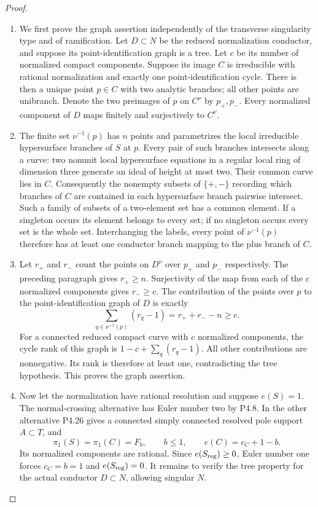 \begin{proof}

\begin{enumerate}[label={$\langle1\rangle$\arabic*.},leftmargin=*]
\item We first prove the graph assertion independently of
the transverse singularity type and of ramification.
Let $D\subset N$ be the reduced normalization conductor,
and suppose its point-identification graph is a tree.
Let $c$ be its number of normalized compact components.
Suppose its image $C$ is irreducible with rational
normalization and exactly one point-identification
cycle. There is then a unique point $p\in C$ with
two analytic branches; all other points are unibranch.
Denote the two preimages of $p$ on $C^\nu$ by
$p_+,p_-$. Every normalized component of $D$ maps
finitely and surjectively to $C^\nu$.

\item The finite set $\nu^{-1}(p)$ has $n$ points and
parametrizes the local irreducible hypersurface
branches of $S$ at $p$. Every pair of such branches
intersects along a curve: two nonunit local
hypersurface equations in a regular local ring of
dimension three generate an ideal of height at most
two. Their common curve lies in $C$. Consequently
the nonempty subsets of $\{+,-\}$ recording which
branches of $C$ are contained in each hypersurface
branch pairwise intersect. Such a family of subsets
of a two-element set has a common element. If a
singleton occurs its element belongs to every set;
if no singleton occurs every set is the whole set.
Interchanging the labels, every point of
$\nu^{-1}(p)$ therefore has at least one conductor
branch mapping to the plus branch of $C$.

\item Let $r_+$ and $r_-$ count the points on $D^\nu$
over $p_+$ and $p_-$ respectively. The preceding
paragraph gives $r_+\ge n$. Surjectivity of the
map from each of the $c$ normalized components
gives $r_-\ge c$. The contribution of the points
over $p$ to the point-identification graph of $D$
is exactly
\[
 \sum_{q\in\nu^{-1}(p)}(r_q-1)
       =r_++r_--n\ge c.
\]
For a connected reduced compact curve with $c$
normalized components, the cycle rank of this graph
is $1-c+\sum_q(r_q-1)$. All other contributions
are nonnegative. Its rank is therefore at least
one, contradicting the tree hypothesis.
This proves the graph assertion.

\item Now let the normalization have rational resolution
and suppose $e(S)=1$. The normal-crossing alternative
has Euler number two by P4.8. In the other alternative
P4.26 gives a connected simply connected resolved
pole support $A\subset T$, and
\[
 \pi_1(S)=\pi_1(C)=F_b,\qquad b\le1,
 \qquad e(C)=c_C+1-b.
\]
Its normalized components are rational.
Since $e(S_{\rm reg})\ge0$, Euler number one forces
$c_C=b=1$ and $e(S_{\rm reg})=0$.
It remains to verify the tree property for the
actual conductor $D\subset N$, allowing singular $N$.


\end{enumerate}
\end{proof}
